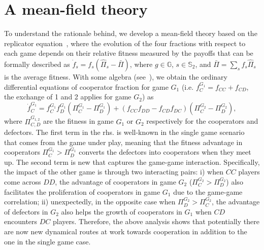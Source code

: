 \documentclass[doublecol]{epl2}
\begin{document}
\section{A mean-field theory}
To understand the rationale behind, we develop a mean-field theory based on the replicator equation~\cite{taylor1978evolutionary,roca2009evolutionary}, where the evolution of the four fractions with respect to each game depends on their relative fitness measured by the payoffs that can be formally described as $\dot{f}_s=f_s(\widehat{\Pi}_s-\bar{\Pi})$, where $g\!\in\! \mathbb{G}$, $s\!\in\! \mathbb{S}_2$, and $\bar{\Pi}=\sum_s f_s\widehat{\Pi}_s$ is the average fitness. With some algebra (see~\cite{Liang2021arXiv}), we obtain the ordinary differential equations of cooperator fraction for game $G_1$ (i.e. $f^{G_1}_C=f_{CC}+f_{CD}$, the exchange of 1 and 2 applies for game $G_2$) as \\
\small
\begin{equation}
\dot{f}^{G_1}_C = f^{G_1}_C f^{G_1}_D (\Pi^{G_1}_C-\Pi^{G_1}_D)+(f_{CC}f_{DD}-f_{CD}f_{DC}) (\Pi^{G_2}_C-\Pi^{G_2}_D),
\label{Eq:meanfield}
\end{equation}
\normalsize
where $\Pi^{G_{1,2}}_{C,D}$ are the fitness in game $G_1$ or $G_2$ respectively for the cooperators and defectors. The first term in the rhs. is well-known in the single game scenario~\cite{smith1982evolution} that comes from the game under play, meaning that the fitness advantage in cooperators $\Pi^{G_1}_C>\Pi^{G_1}_D$ converts the defectors into cooperators when they meet up. The second term is new that captures the game-game interaction. Specifically, the impact of the other game is through two interacting pairs: i) when $CC$ players come across $DD$, the advantage of cooperators in game $G_2$ ($\Pi^{G_2}_C>\Pi^{G_2}_D$) also facilitates the proliferation of cooperators in game $G_1$ due to the game-game correlation; ii) unexpectedly, in the opposite case when $\Pi^{G_2}_D>\Pi^{G_2}_C$, the advantage of defectors in $G_2$ also helps the growth of cooperators in $G_1$ when $CD$ encounters $DC$ players. Therefore, the above analysis shows that potentially there are now new dynamical routes at work towards cooperation in addition to the one in the single game case.
\end{document}
